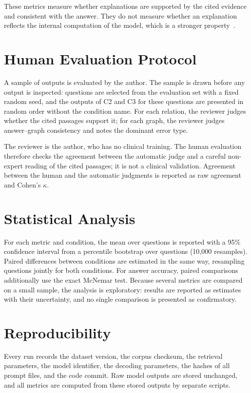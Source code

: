 These metrics measure whether explanations are supported by the cited evidence and consistent with the answer. They do not measure whether an explanation reflects the internal computation of the model, which is a stronger property~\cite{lyu_faithful_2024}.

\section{Human Evaluation Protocol}
\label{sec:human_eval}

A sample of outputs is evaluated by the author. The sample is drawn before any output is inspected:  questions are selected from the evaluation set with a fixed random seed, and the outputs of C2 and C3 for these questions are presented in random order without the condition name. For each relation, the reviewer judges whether the cited passages support it; for each graph, the reviewer judges answer--graph consistency and notes the dominant error type.

The reviewer is the author, who has no clinical training. The human evaluation therefore checks the agreement between the automatic judge and a careful non-expert reading of the cited passages; it is not a clinical validation. Agreement between the human and the automatic judgments is reported as raw agreement and Cohen's $\kappa$.

\section{Statistical Analysis}
\label{sec:statistics}

For each metric and condition, the mean over questions is reported with a 95\% confidence interval from a percentile bootstrap over questions (10{,}000 resamples). Paired differences between conditions are estimated in the same way, resampling questions jointly for both conditions. For answer accuracy, paired comparisons additionally use the exact McNemar test. Because several metrics are compared on a small sample, the analysis is exploratory: results are reported as estimates with their uncertainty, and no single comparison is presented as confirmatory.

\section{Reproducibility}
\label{sec:reproducibility}

Every run records the dataset version, the corpus checksum, the retrieval parameters, the model identifier, the decoding parameters, the hashes of all prompt files, and the code commit. Raw model outputs are stored unchanged, and all metrics are computed from these stored outputs by separate scripts. 
